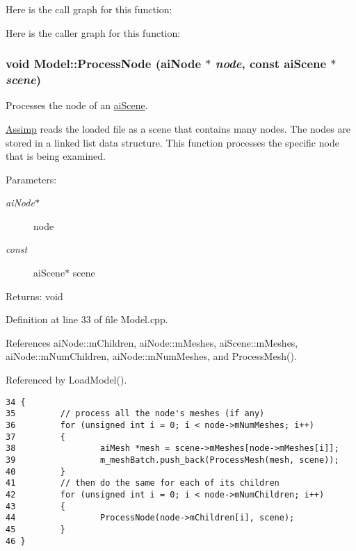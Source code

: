 Here is the call graph for this function:

Here is the caller graph for this function:\hypertarget{class_model_9bb9d5cd67e4cd9dc95c01bedd92034a}{
\subsubsection[ProcessNode]{\setlength{\rightskip}{0pt plus 5cm}void Model::ProcessNode ({\bf aiNode} $\ast$ {\em node}, \/  const {\bf aiScene} $\ast$ {\em scene})}}
\label{class_model_9bb9d5cd67e4cd9dc95c01bedd92034a}


Processes the node of an \hyperlink{structai_scene}{aiScene}. 

\hyperlink{namespace_assimp}{Assimp} reads the loaded file as a scene that contains many nodes. The nodes are stored in a linked list data structure. This function processes the specific node that is being examined.

\begin{Desc}
\item[Parameters:]
\begin{description}
\item[{\em aiNode$\ast$}]node \item[{\em const}]aiScene$\ast$ scene \end{description}
\end{Desc}
\begin{Desc}
\item[Returns:]void \end{Desc}


Definition at line 33 of file Model.cpp.

References aiNode::mChildren, aiNode::mMeshes, aiScene::mMeshes, aiNode::mNumChildren, aiNode::mNumMeshes, and ProcessMesh().

Referenced by LoadModel().

\begin{Code}\begin{verbatim}34 {
35         // process all the node's meshes (if any)
36         for (unsigned int i = 0; i < node->mNumMeshes; i++)
37         {
38                 aiMesh *mesh = scene->mMeshes[node->mMeshes[i]];
39                 m_meshBatch.push_back(ProcessMesh(mesh, scene));
40         }
41         // then do the same for each of its children
42         for (unsigned int i = 0; i < node->mNumChildren; i++)
43         {
44                 ProcessNode(node->mChildren[i], scene);
45         }
46 }
\end{verbatim}
\end{Code}




